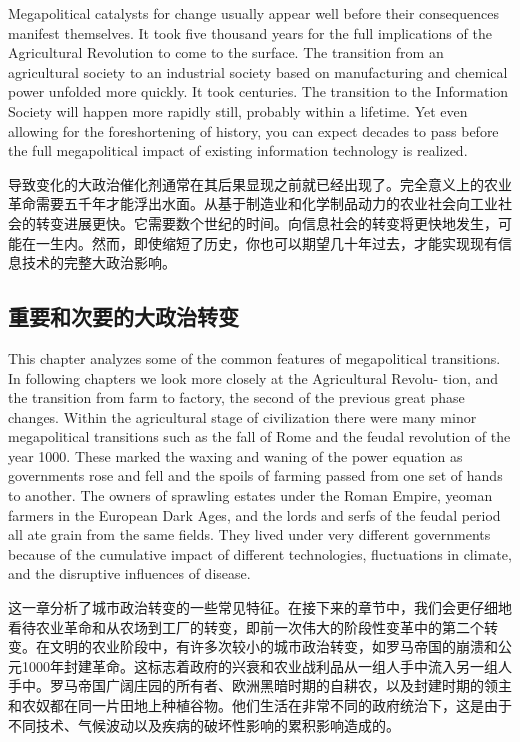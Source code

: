 \begin{Parallel}{97mm}{45mm}
  \ParallelLText
  {Megapolitical catalysts for change usually appear well before their consequences manifest themselves. It took five thousand years for the full implications of the Agricultural Revolution to come to the surface. The transition from an agricultural society to an industrial society based on manufacturing and chemical power unfolded more quickly. It took centuries. The transition to the Information Society will happen more rapidly still, probably within a lifetime. Yet even allowing for the foreshortening of history, you can expect decades to pass before the full megapolitical impact of existing information technology is realized.}
  
  \ParallelRText
  {导致变化的大政治催化剂通常在其后果显现之前就已经出现了。完全意义上的农业革命需要五千年才能浮出水面。从基于制造业和化学制品动力的农业社会向工业社会的转变进展更快。它需要数个世纪的时间。向信息社会的转变将更快地发生，可能在一生内。然而，即使缩短了历史，你也可以期望几十年过去，才能实现现有信息技术的完整大政治影响。}
  \ParallelPar

  \subsection{重要和次要的大政治转变}


  \ParallelLText
  {This chapter analyzes some of the common features of megapolitical transitions. In following chapters we look more closely at the Agricultural Revolu- tion, and the transition from farm to factory, the second of the previous great phase changes. Within the agricultural stage of civilization there were many minor megapolitical transitions such as the fall of Rome and the feudal revolution of the year 1000. These marked the waxing and waning of the power equation as governments rose and fell and the spoils of farming passed from one set of hands to another. The owners of sprawling estates under the Roman Empire, yeoman farmers in the European Dark Ages, and the lords and serfs of the feudal period all ate grain from the same fields. They lived under very different governments because of the cumulative impact of different technologies, fluctuations in climate, and the disruptive influences of disease.}
  
  \ParallelRText
  {这一章分析了城市政治转变的一些常见特征。在接下来的章节中，我们会更仔细地看待农业革命和从农场到工厂的转变，即前一次伟大的阶段性变革中的第二个转变。在文明的农业阶段中，有许多次较小的城市政治转变，如罗马帝国的崩溃和公元1000年封建革命。这标志着政府的兴衰和农业战利品从一组人手中流入另一组人手中。罗马帝国广阔庄园的所有者、欧洲黑暗时期的自耕农，以及封建时期的领主和农奴都在同一片田地上种植谷物。他们生活在非常不同的政府统治下，这是由于不同技术、气候波动以及疾病的破坏性影响的累积影响造成的。}
  \ParallelPar




\end{Parallel}
